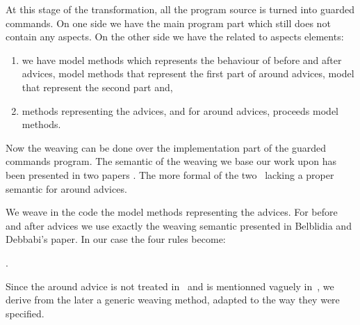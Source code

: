 At this stage of the transformation, all the program source is turned
into guarded commands. On one side we have the main program part 
which still does not contain any aspects. On the other side
we have the related to aspects elements:
\begin{enumerate}
\item 
we have model methods which represents the behaviour of before and
after advices, model methods that represent the first part of around
advices, model that represent the second part and,
\item
methods representing the advices, and for around advices, proceeds 
model methods.
\end{enumerate}

Now the weaving can be done over the implementation part of the
guarded commands program. The semantic of the weaving we base our work
upon has been presented in two papers \cite{weaving04,weaving06}.  The
more formal of the two~\cite{weaving06} lacking a proper semantic for
around advices.

We weave in the code the model methods representing the advices.  For
before and after advices we use exactly the weaving semantic presented
in Belblidia and Debbabi's paper.
In our case the four rules become:

.

Since the around advice is not treated in~\cite{weaving06} and is 
mentionned vaguely in~\cite{weaving04}, we derive from the later
a generic weaving method, adapted to the way they were specified.








%
